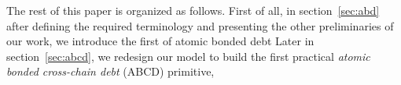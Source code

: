 







 
The rest of this paper is organized as follows. First of all, in section~\ref{sec:abd} after defining the required terminology and presenting the other preliminaries of our work, we introduce the first  of atomic bonded debt  Later in section~\ref{sec:abcd}, we redesign our model to build the first practical \emph{atomic bonded cross-chain debt} (ABCD) primitive, 






